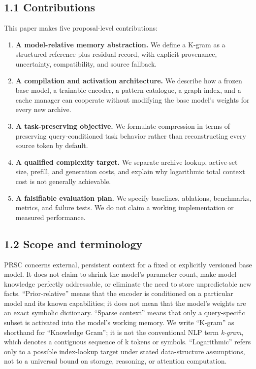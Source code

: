 \documentclass[
  10pt,
]{article}
\providecommand{\tightlist}{%
  \setlength{\itemsep}{0pt}\setlength{\parskip}{0pt}}
\begin{document}
\subsection{1.1 Contributions}\label{contributions}

This paper makes five proposal-level contributions:

\begin{enumerate}
\def\labelenumi{\arabic{enumi}.}
\tightlist
\item
  \textbf{A model-relative memory abstraction.} We define a K-gram as a
  structured reference-plus-residual record, with explicit provenance,
  uncertainty, compatibility, and source fallback.
\item
  \textbf{A compilation and activation architecture.} We describe how a
  frozen base model, a trainable encoder, a pattern catalogue, a graph
  index, and a cache manager can cooperate without modifying the base
  model's weights for every new archive.
\item
  \textbf{A task-preserving objective.} We formulate compression in
  terms of preserving query-conditioned task behavior rather than
  reconstructing every source token by default.
\item
  \textbf{A qualified complexity target.} We separate archive lookup,
  active-set size, prefill, and generation costs, and explain why
  logarithmic total context cost is not generally achievable.
\item
  \textbf{A falsifiable evaluation plan.} We specify baselines,
  ablations, benchmarks, metrics, and failure tests. We do not claim a
  working implementation or measured performance.
\end{enumerate}

\subsection{1.2 Scope and terminology}\label{scope-and-terminology}

PRSC concerns external, persistent context for a fixed or explicitly
versioned base model. It does not claim to shrink the model's parameter
count, make model knowledge perfectly addressable, or eliminate the need
to store unpredictable new facts. ``Prior-relative'' means that the
encoder is conditioned on a particular model and its known capabilities;
it does not mean that the model's weights are an exact symbolic
dictionary. ``Sparse context'' means that only a query-specific subset
is activated into the model's working memory. We write ``K-gram'' as
shorthand for ``Knowledge Gram''; it is not the conventional NLP term
\emph{k-gram}, which denotes a contiguous sequence of k tokens or
symbols. ``Logarithmic'' refers only to a possible index-lookup target
under stated data-structure assumptions, not to a universal bound on
storage, reasoning, or attention computation.
\end{document}
